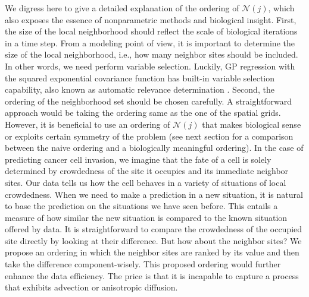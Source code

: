 \documentclass[smallextended,natbib]{svjour3}       %
\begin{document}
We digress here to give a detailed explanation of the ordering of $\mathcal{N}(j)$, which also exposes the essence of nonparametric methods and biological insight. First, the size of the local neighborhood should reflect the scale of biological iterations in a time step. From a modeling point of view, it is important to determine the size of the local neighborhood, i.e., how many neighbor sites should be included. In other words, we need perform variable selection. Luckily, GP regression with the squared exponential covariance function has built-in variable selection capability, also known as automatic relevance determination \citep{neal2012bayesian,williams1996gaussian,Rasmussen2006}. Second, the ordering of the neighborhood set should be chosen carefully. A straightforward approach would be taking the ordering same as the one of the spatial grids. However, it is beneficial to use an ordering of $\mathcal{N}(j)$ that makes biological sense or exploits certain symmetry of the problem (see next section for a comparison between the naive ordering and a biologically meaningful ordering). In the case of predicting cancer cell invasion, we imagine that the fate of a cell is solely determined by crowdedness of the site it occupies and its immediate neighbor sites. Our data tells us how the cell behaves in a variety of situations of local crowdedness. When we need to make a prediction in a new situation, it is natural to base the prediction on the situations we have seen before. This entails a measure of how similar the new situation is compared to the known situation offered by data. It is straightforward to compare the crowdedness of the occupied site directly by looking at their difference. But how about the neighbor sites? We propose an ordering in which the neighbor sites are ranked by its value and then take the difference component-wisely. This proposed ordering would further enhance the data efficiency. The price is that it is incapable to capture a process that exhibits advection or anisotropic diffusion. 
\end{document}
